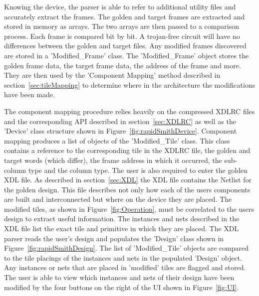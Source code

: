 Knowing the device, the parser is able to refer to additional utility files and accurately extract the frames.
The \gls{golden} and \gls{target} frames are extracted and stored in memory as arrays.
The two arrays are then passed to a comparison process.
Each frame is compared bit by bit.
A trojan-free circuit will have no differences between the \gls{golden} and \gls{target} files.
Any modified frames discovered are stored in a 'Modified\_Frame' class.
The 'Modified\_Frame' object stores the \gls{golden} frame data, the \gls{target} frame data, the address of the frame and more.
They are then used by the 'Component Mapping' method described in section~\ref{sec:tileMapping} to determine where in the architecture the modifications have been made.

The component mapping procedure relies heavily on the compressed XDLRC files and the corresponding \acrshort{API} described in section~\ref{sec:XDLRC} as well as the 'Device' class structure shown in Figure~\ref{fig:rapidSmithDevice}.
Component mapping produces a list of objects of the 'Modified\_Tile' class.
This class contains a reference to the corresponding tile in the XDLRC file, the \gls{golden} and \gls{target} words (which differ), the frame address in which it occurred, the sub-column type and the column type.
The user is also required to enter the \gls{golden} \acrshort{XDL} file.
As described in section~\ref{sec:XDL} the \acrshort{XDL} file contains the Netlist for the \gls{golden} design.
This file describes not only how each of the users components are built and interconnected but where on the device they are placed.
The modified tiles, as shown in Figure~\ref{fig:Operation}, must be correlated to the users design to extract useful information.
The instances and nets described in the \acrshort{XDL} file list the exact tile and primitive in which they are placed.
The \RapidSmith \acrshort{XDL} parser reads the user's design and populates the 'Design' class shown in Figure~\ref{fig:rapidSmithDesign}.
The list of 'Modified\_Tile' objects are compared to the tile placings of the instances and nets in the populated 'Design' object.
Any instances or nets that are placed in 'modified' tiles are flagged and stored.
The user is able to view which instances and nets of their design have been modified by the four buttons on the right of the \acrshort{UI} shown in Figure~\ref{fig:UI}.
